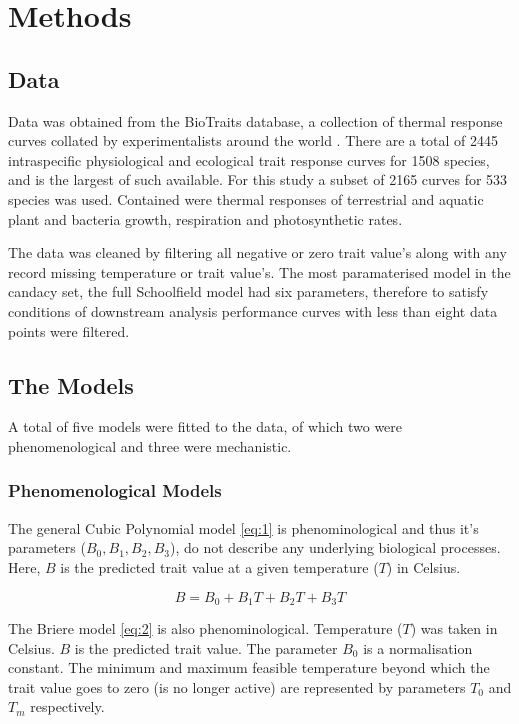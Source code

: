 \documentclass[11pt]{article}
\begin{document}
	
	\newpage
	
	
	\section{Methods}
	
	\subsection{Data}
	Data was obtained from the BioTraits database, a collection of thermal response curves collated by experimentalists around the world \citep{della2013thermal}. There are a total of 2445 intraspecific physiological and ecological trait response curves for 1508 species, and is the largest of such available. For this study a subset of 2165 curves for 533 species was used. Contained were thermal responses of terrestrial and aquatic plant and bacteria growth, respiration and photosynthetic rates. 
	
	The data was cleaned by filtering all negative or zero trait value's along with any record missing temperature or trait value's. The most paramaterised model in the candacy set, the full Schoolfield model had six parameters, therefore to satisfy conditions of downstream analysis performance curves with less than eight data points were filtered. 
	
	\subsection{The Models}
	A total of five models were fitted to the data, of which two were phenomenological and three were mechanistic.  
	
	\subsubsection{Phenomenological Models}
	The general Cubic Polynomial model \eqref{eq:1} is phenominological and thus it's parameters (\(B_{0}, B_{1}, B_{2}, B_{3}\)), do not describe any underlying biological processes. Here, \(B\) is the predicted trait value at a given temperature (\(T\)) in Celsius. 
	   
	\begin{equation}
	B = B_{0} + B_{1}T + B_{2}T + B_{3}T \label{eq:1}
	\end{equation}
	
	The Briere model \eqref{eq:2} is also phenominological. Temperature (\(T\))  was taken in Celsius. \(B\) is the predicted trait value. The parameter \(B_{0}\) is a normalisation constant. The minimum and maximum feasible temperature beyond which the trait value goes to zero (is no longer active) are represented by parameters \(T_{0}\) and \(T_{m}\) respectively. 
	
\end{document}
